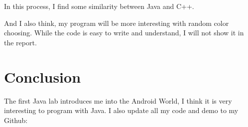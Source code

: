 \documentclass{article}
\begin{document}
	In this process, I find some similarity between Java and C++. 
	
	And I also think, my program will be more interesting with random color choosing. While the code is easy to write and understand, I will not show it in the report.
	
	\section{Conclusion}
	The first Java lab introduces me into the Android World, I think it is very interesting to program with Java. I also update all my code and demo to my Github: 
	
	
	
	
\end{document}

